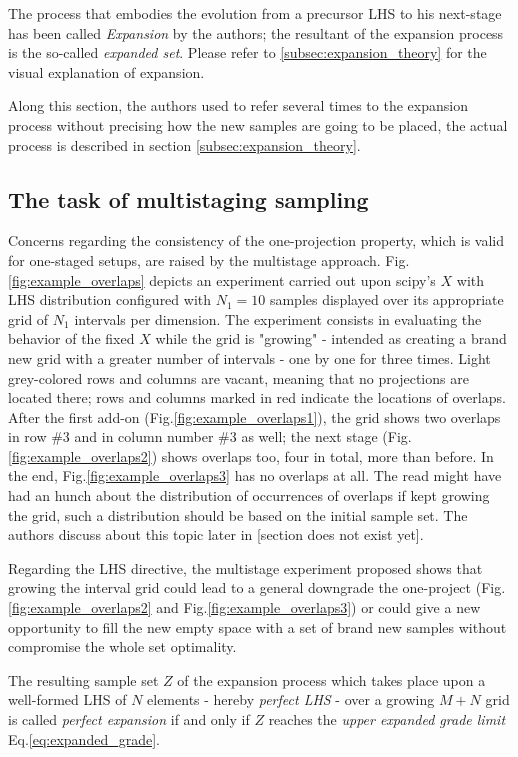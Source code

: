 \documentclass[12pt]{article}
\newcommand{\meqref}[1]{Eq.\ref{#1}}
\newcommand{\mfigref}[1]{Fig.\ref{#1}}
\begin{document}
The process that embodies the evolution from a precursor LHS to his next-stage has been called \textit{Expansion} by the authors; the resultant of the expansion process is the so-called \textit{expanded set}. Please refer to \cref{subsec:expansion_theory} for the visual explanation of expansion.

Along this section, the authors used to refer several times to the expansion process without precising how the new samples are going to be placed, the actual process is described in section \cref{subsec:expansion_theory}.

\subsection{The task of multistaging sampling}
\label{subsec:multistage_task}
Concerns regarding the consistency of the one-projection property, which is valid for one-staged setups, are raised by the multistage approach. \mfigref{fig:example_overlaps} depicts an experiment carried out upon scipy's $X$ with LHS distribution configured with $N_1 = 10$ samples displayed over its appropriate grid of $N_1$ intervals per dimension. The experiment consists in evaluating the behavior of the fixed $X$ while the grid is "growing" - intended as creating a brand new grid with  a greater number of intervals - one by one for three times. 
Light grey-colored rows and columns are vacant, meaning that no projections are located there; rows and columns marked in red indicate the locations of overlaps. After the first add-on (\mfigref{fig:example_overlaps1}), the grid shows two overlaps in row \#3 and in column number \#3 as well; the next stage (\mfigref{fig:example_overlaps2}) shows overlaps too, four in total, more than before. In the end, \mfigref{fig:example_overlaps3} has no overlaps at all. The read might have had an hunch about the distribution of occurrences of overlaps if kept growing the grid, such a distribution should be based on the initial sample set. The authors discuss about this topic later in [section does not exist yet].

Regarding the LHS directive, the multistage experiment proposed shows that growing the interval grid could lead to a general downgrade the one-project (\mfigref{fig:example_overlaps2} and \mfigref{fig:example_overlaps3}) or could give a new opportunity to fill the new empty space with a set of brand new samples without compromise the whole set optimality. 

The resulting sample set $Z$ of the expansion process which takes place upon a well-formed LHS of $N$ elements - hereby \textit{perfect LHS} - over a growing $M+N$ grid is called \textit{perfect expansion} if and only if $Z$ reaches the \textit{upper expanded grade limit} \meqref{eq:expanded_grade}.
\end{document}

